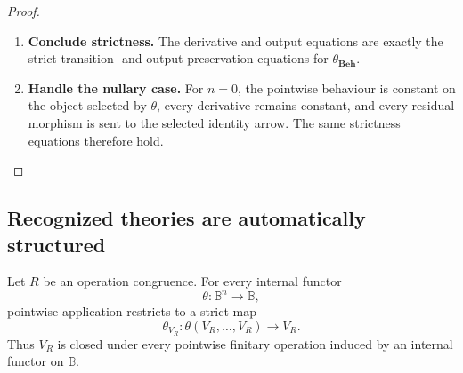 \begin{proof}
\begin{enumerate}
        \item \textbf{Conclude strictness.}
        The derivative and output equations are exactly the strict
        transition- and output-preservation equations for
        \(\theta_{\mathbf{Beh}}\).

        \item \textbf{Handle the nullary case.}
        For \(n=0\), the pointwise behaviour is constant on the object
        selected by \(\theta\), every derivative remains constant, and every
        residual morphism is sent to the selected identity arrow. The same
        strictness equations therefore hold.
    \end{enumerate}
\end{proof}

\subsection{Recognized theories are automatically structured}
\label{subsec:to-recognized-theories-structured}

\begin{theorem}
\label{thm:to-automatic-structured-closure}
    Let \(R\) be an operation congruence. For every internal functor
    \[
        \theta:\mathbb B^n\to\mathbb B,
    \]
    pointwise application restricts to a strict map
    \[
        \theta_{V_R}:
        \theta(V_R,\dots,V_R)
        \to
        V_R.
    \]
    Thus \(V_R\) is closed under every pointwise finitary operation induced by
    an internal functor on \(\mathbb B\).
\end{theorem}

